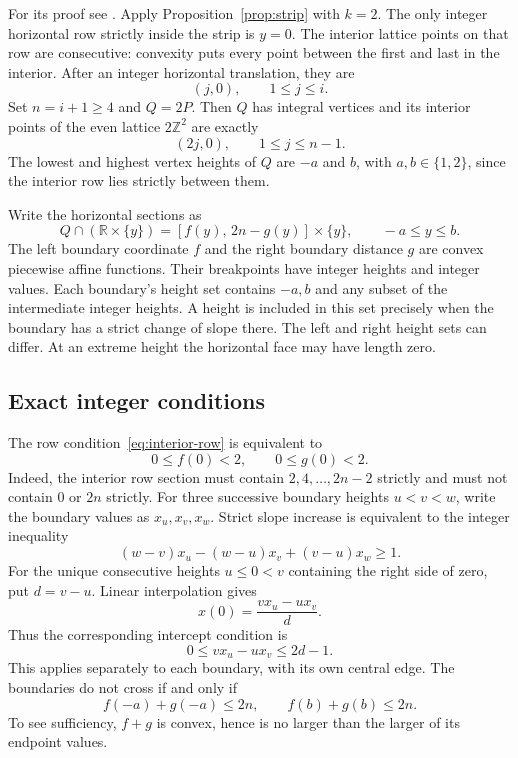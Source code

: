 \documentclass[11pt]{article}
\theoremstyle{remark}
\numberwithin{equation}{section}
\newcommand{\Z}{\mathbb Z}
\newcommand{\R}{\mathbb R}
\begin{document}
For its proof see \cite[pp.~1248--1249]{BS}.
Apply Proposition~\ref{prop:strip} with $k=2$.
The only integer horizontal row strictly inside the strip is $y=0$.
The interior lattice points on that row are consecutive: convexity puts every
point between the first and last in the interior. After an integer horizontal
translation, they are
\[
 (j,0),\qquad 1\leq j\leq i.
\]
Set $n=i+1\geq4$ and $Q=2P$. Then $Q$ has integral vertices and its interior
points of the even lattice $2\Z^2$ are exactly
\begin{equation}\label{eq:interior-row}
 (2j,0),\qquad 1\leq j\leq n-1.
\end{equation}
The lowest and highest vertex heights of $Q$ are $-a$ and $b$, with
$a,b\in\{1,2\}$, since the interior row lies strictly between them.

Write the horizontal sections as
\begin{equation}\label{eq:section}
 Q\cap(\R\times\{y\})=[f(y),\,2n-g(y)]\times\{y\},
 \qquad -a\leq y\leq b.
\end{equation}
The left boundary coordinate $f$ and the right boundary distance $g$ are
convex piecewise affine functions. Their breakpoints have integer heights
and integer values. Each boundary's height set contains $-a,b$ and any
subset of the intermediate integer heights. A height is included in this
set precisely when the boundary has a strict change of slope there.
The left and right height sets can differ. At an extreme height the
horizontal face may have length zero.

\subsection{Exact integer conditions}

The row condition~\eqref{eq:interior-row} is equivalent to
\begin{equation}\label{eq:intercepts}
 0\leq f(0)<2,\qquad 0\leq g(0)<2.
\end{equation}
Indeed, the interior row section must contain $2,4,\ldots,2n-2$ strictly and
must not contain $0$ or $2n$ strictly.
For three successive boundary heights $u<v<w$, write the boundary values
as $x_u,x_v,x_w$. Strict slope increase is equivalent to the integer
inequality
\begin{equation}\label{eq:convex}
 (w-v)x_u-(w-u)x_v+(v-u)x_w\geq1.
\end{equation}
For the unique consecutive heights $u\leq0<v$ containing the right side of
zero, put $d=v-u$. Linear interpolation gives
\[
 x(0)=\frac{v x_u-u x_v}{d}.
\]
Thus the corresponding intercept condition is
\begin{equation}\label{eq:integer-intercept}
 0\leq v x_u-u x_v\leq2d-1.
\end{equation}
This applies separately to each boundary, with its own central edge.
The boundaries do not cross if and only if
\begin{equation}\label{eq:width-endpoints}
 f(-a)+g(-a)\leq2n,\qquad f(b)+g(b)\leq2n.
\end{equation}
To see sufficiency, $f+g$ is convex, hence is no larger than the larger of its
endpoint values.
\end{document}
